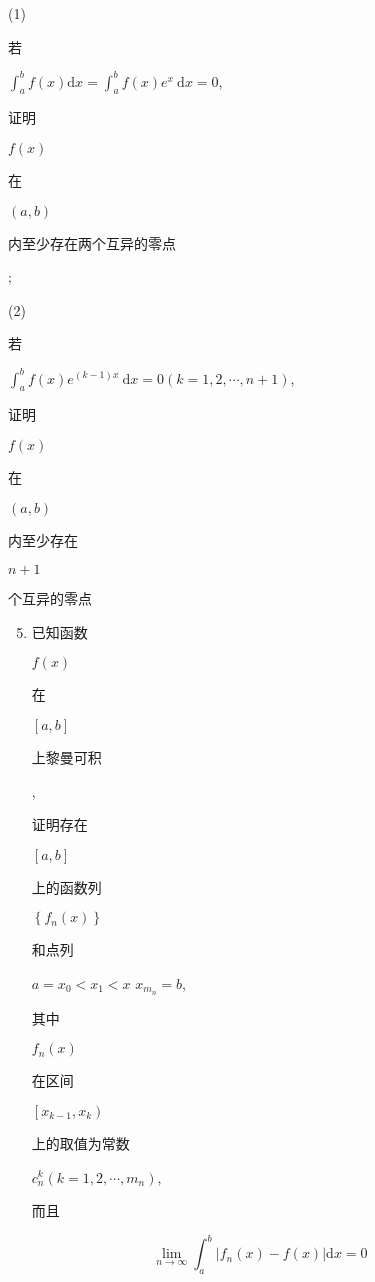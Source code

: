 \documentclass[10pt]{article}
\begin{document}
(1) \begin{CJK}{UTF8}{mj}若\end{CJK} $\int_{a}^{b} f(x) \mathrm{d} x=\int_{a}^{b} f(x) e^{x} \mathrm{~d} x=0$, \begin{CJK}{UTF8}{mj}证明\end{CJK} $f(x)$ \begin{CJK}{UTF8}{mj}在\end{CJK} $(a, b)$ \begin{CJK}{UTF8}{mj}内至少存在两个互异的零点\end{CJK};

(2) \begin{CJK}{UTF8}{mj}若\end{CJK} $\int_{a}^{b} f(x) e^{(k-1) x} \mathrm{~d} x=0(k=1,2, \cdots, n+1)$, \begin{CJK}{UTF8}{mj}证明\end{CJK} $f(x)$ \begin{CJK}{UTF8}{mj}在\end{CJK} $(a, b)$ \begin{CJK}{UTF8}{mj}内至少存在\end{CJK} $n+1$ \begin{CJK}{UTF8}{mj}个互异的零点\end{CJK}

\begin{enumerate}
  \setcounter{enumi}{4}
  \item \begin{CJK}{UTF8}{mj}已知函数\end{CJK} $f(x)$ \begin{CJK}{UTF8}{mj}在\end{CJK} $[a, b]$ \begin{CJK}{UTF8}{mj}上黎曼可积\end{CJK}, \begin{CJK}{UTF8}{mj}证明存在\end{CJK} $[a, b]$ \begin{CJK}{UTF8}{mj}上的函数列\end{CJK} $\left\{f_{n}(x)\right\}$ \begin{CJK}{UTF8}{mj}和点列\end{CJK} $a=x_{0}<x_{1}<x$ $x_{m_{n}}=b$, \begin{CJK}{UTF8}{mj}其中\end{CJK} $f_{n}(x)$ \begin{CJK}{UTF8}{mj}在区间\end{CJK} $\left[x_{k-1}, x_{k}\right)$ \begin{CJK}{UTF8}{mj}上的取值为常数\end{CJK} $c_{n}^{k}\left(k=1,2, \cdots, m_{n}\right)$, \begin{CJK}{UTF8}{mj}而且\end{CJK}
\end{enumerate}
$$
\lim _{n \rightarrow \infty} \int_{a}^{b}\left|f_{n}(x)-f(x)\right| \mathrm{d} x=0
$$
\end{document}
